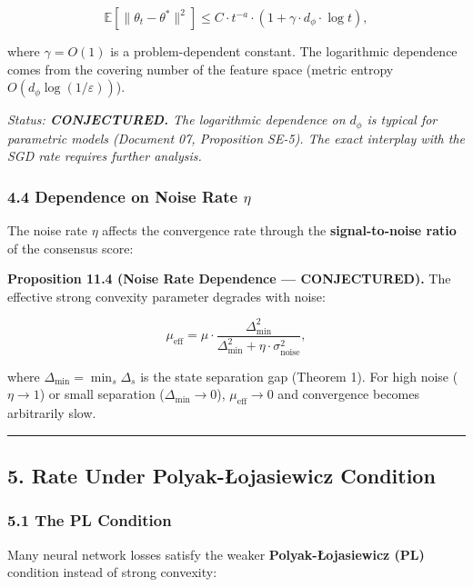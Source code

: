 \documentclass[
  12pt,
]{ctexart}
\begin{document}
\[\mathbb{E}[\|\theta_t - \theta^*\|^2] \leq C \cdot t^{-a} \cdot (1 + \gamma \cdot d_\phi \cdot \log t),\]

where \(\gamma = O(1)\) is a problem-dependent constant. The logarithmic
dependence comes from the covering number of the feature space (metric
entropy \(O(d_\phi \log(1/\varepsilon))\)).

\emph{Status: \textbf{CONJECTURED.} The logarithmic dependence on
\(d_\phi\) is typical for parametric models (Document 07, Proposition
SE-5). The exact interplay with the SGD rate requires further analysis.}

\subsubsection{\texorpdfstring{4.4 Dependence on Noise Rate
\(\eta\)}{4.4 Dependence on Noise Rate \textbackslash eta}}\label{dependence-on-noise-rate-eta}

The noise rate \(\eta\) affects the convergence rate through the
\textbf{signal-to-noise ratio} of the consensus score:

\textbf{Proposition 11.4 (Noise Rate Dependence --- CONJECTURED).} The
effective strong convexity parameter degrades with noise:

\[\mu_{\text{eff}} = \mu \cdot \frac{\Delta_{\min}^2}{\Delta_{\min}^2 + \eta \cdot \sigma_{\text{noise}}^2},\]

where \(\Delta_{\min} = \min_s \Delta_s\) is the state separation gap
(Theorem 1). For high noise (\(\eta \to 1\)) or small separation
(\(\Delta_{\min} \to 0\)), \(\mu_{\text{eff}} \to 0\) and convergence
becomes arbitrarily slow.

\begin{center}\rule{0.5\linewidth}{0.5pt}\end{center}

\subsection{5. Rate Under Polyak-Łojasiewicz
Condition}\label{rate-under-polyak-ux142ojasiewicz-condition}

\subsubsection{5.1 The PL Condition}\label{the-pl-condition}

Many neural network losses satisfy the weaker \textbf{Polyak-Łojasiewicz
(PL)} condition instead of strong convexity:
\end{document}
